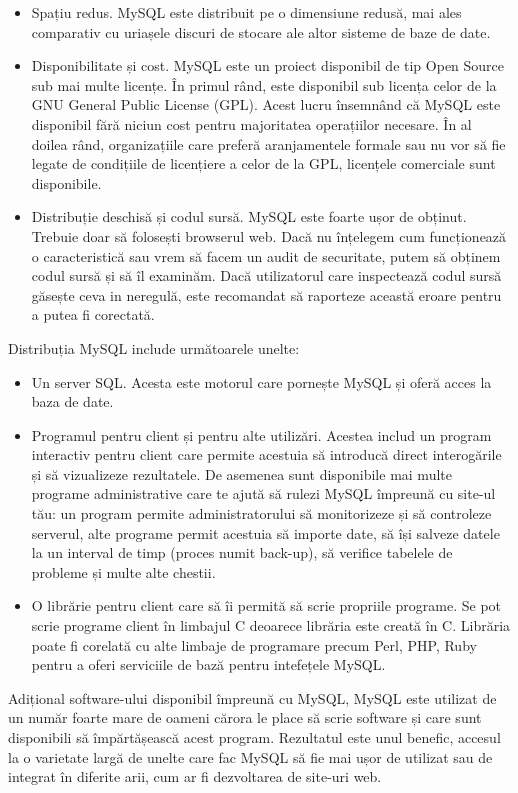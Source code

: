 \documentclass[12pt]{book}
\begin{document}
\begin{addmargin}[4em]{1em}
\begin{itemize}
	\item Spațiu redus. MySQL este distribuit pe o dimensiune redusă, mai ales comparativ cu uriașele discuri de stocare ale altor sisteme de baze de date.
	\item Disponibilitate și cost. MySQL este un proiect disponibil de tip Open Source sub mai multe licențe. În primul rând, este disponibil sub licența celor de la GNU General Public License (GPL). Acest lucru însemnând că MySQL este disponibil fără niciun cost pentru majoritatea operațiilor necesare. În al doilea rând, organizațiile care preferă aranjamentele formale sau nu vor să fie legate de condițiile de licențiere a celor de la GPL, licențele comerciale sunt disponibile.
	\item Distribuție deschisă și codul sursă. MySQL este foarte ușor de obținut. Trebuie doar să folosești browserul web. Dacă nu înțelegem cum funcționează o caracteristică sau vrem să facem un audit de securitate, putem să obținem codul sursă și să îl examinăm. Dacă utilizatorul care inspectează codul sursă găsește ceva in neregulă, este recomandat să raporteze această eroare pentru a putea fi corectată.\cite{mySqlDeveloperLibrary}
\end{itemize}
\end{addmargin}
\bigbreak
Distribuția MySQL include următoarele unelte:
\begin{addmargin}[4em]{1em}
\begin{itemize}
\item Un server SQL. Acesta este motorul care pornește MySQL și oferă acces la baza de date.
\item Programul pentru client și pentru alte utilizări. Acestea includ un program interactiv pentru client care permite acestuia să introducă direct interogările și să vizualizeze rezultatele. De asemenea sunt disponibile mai multe programe administrative care te ajută să rulezi MySQL împreună cu site-ul tău: un program permite administratorului să monitorizeze și să controleze serverul, alte programe permit acestuia să importe date, să își salveze datele la un interval de timp (proces numit back-up), să verifice tabelele de probleme și multe alte chestii.
\item O librărie pentru client care să îi permită să scrie propriile programe. Se pot scrie programe client în limbajul C deoarece librăria este creată în C. Librăria poate fi corelată cu alte limbaje de programare precum Perl, PHP, Ruby pentru a oferi serviciile de bază pentru intefețele MySQL.\cite{mySqlDeveloperLibrary}
\end{itemize}
\end{addmargin}
\bigbreak
Adițional software-ului disponibil împreună cu MySQL, MySQL este utilizat de un număr foarte mare de oameni cărora le place să scrie software și care sunt disponibili să împărtășească acest program. Rezultatul este unul benefic, accesul la o varietate largă de unelte care fac MySQL să fie mai ușor de utilizat sau de integrat în diferite arii, cum ar fi dezvoltarea de site-uri web. \cite{mySqlDeveloperLibrary}
\end{document}
